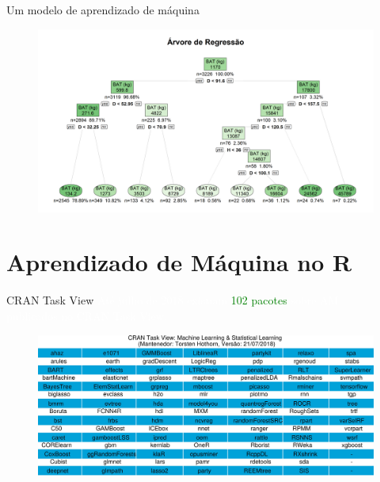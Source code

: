 \documentclass[12pt,ignorenonframetext,aspectratio=1610]{beamer}
\begin{document}
\begin{frame}[t]{Um modelo de aprendizado de máquina}
	
\begin{figure}[H]
	\centering
	\includegraphics[scale=0.5]{Fig/CART.png}
\end{figure}
	
\end{frame}

\section{Aprendizado de Máquina no R}

\begin{frame}[t]{CRAN Task View}
	\justifying
	\hspace{5cm} \textcolor{white}{Até julho de 2018 existiam} \textcolor{green}{102 pacotes} \textcolor{white}{sobre AM \\ \hspace{5cm} publicados no CRAN Task View.}
	
	\begin{figure}[H]
		\centering
		\includegraphics[scale=0.6]{Fig/Task2.jpeg}
	\end{figure}
	
\end{frame}
\end{document}
